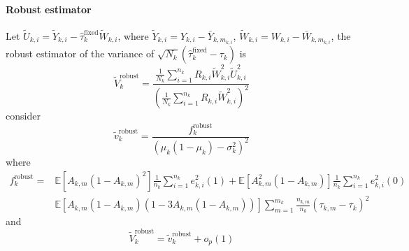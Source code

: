 \documentclass[twoside]{article}
\begin{document}
\paragraph*{Robust estimator}
Let $\tilde{U}_{k,i} = \tilde{Y}_{k,i} - \hat{\tau}_k^{\text{fixed}}\tilde{W}_{k,i}$, where $\tilde{Y}_{k,i} = Y_{k,i}-\bar{Y}_{k,m_{k,i}}$, $\tilde{W}_{k,i}=W_{k,i}-\bar{W}_{k,m_{k,i}}$, the robust estimator of the variance of $\sqrt{N_k}\left(\hat{\tau}^{\text{fixed}}_k-\tau_k\right)$ is 
\begin{equation*}
    \tilde{V}^{\text{robust}}_k = \frac{\frac{1}{N_k}\sum^{n_k}_{i=1} R_{k,i}\tilde{W}^2_{k,i}\tilde{U}^2_{k,i} }{ \left(\frac{1}{N_k}\sum^{n_k}_{i=1}R_{k,i}\tilde{W}^2_{k,i}\right)^2 }
\end{equation*}
consider 
\begin{equation*}
    \tilde{v}_k^{\text{robust}} = \frac{f^{\text{robust}}_k}{ \left( \mu_k\left(1-\mu_k\right)-\sigma^2_k \right)^2}
\end{equation*}
where 
\begin{align*}
    f_k^{\text{robust}} =& \mathbb{E}\left[A_{k,m}\left(1-A_{k,m}\right)^2\right]\frac{1}{n_k}\sum^{n_k}_{i=1}e^2_{k,i}(1) + \mathbb{E}\left[A_{k,m}^2\left(1-A_{k,m}\right)\right]\frac{1}{n_k}\sum^{n_k}_{i=1}e^2_{k,i}(0) \\
    & \mathbb{E}\left[A_{k,m}\left(1-A_{k,m}\right)\left(1-3A_{k,m}\left(1-A_{k,m}\right)\right)\right] \sum^{m_k}_{m=1}\frac{n_{k,m}}{n_k}(\tau_{k,m}-\tau_k)^2
\end{align*}
and 
\begin{equation*}
    \tilde{V}_k^{\text{robust}} = \tilde{v}^{\text{robust}}_k + o_p(1)
\end{equation*}
\end{document}
